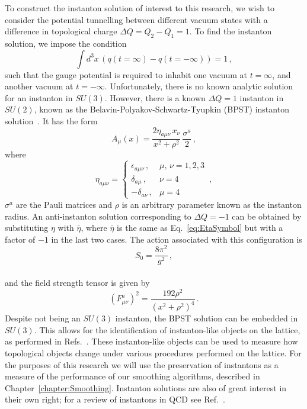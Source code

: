 To construct the instanton solution of interest to this research, we wish to consider the potential tunnelling between different vacuum states with a difference in topological charge $\Delta Q = Q_2-Q_1 =1$. To find the instanton solution, we impose the condition
%
\begin{equation}
\int d^3x \,\left(q(t=\infty)-q(t=-\infty)\right)=1\, ,
\end{equation}
%
such that the gauge potential is required to inhabit one vacuum at $t=\infty$, and another vacuum at $t=-\infty$. Unfortunately, there is no known analytic solution for an instanton in $SU(3)$. However, there is a known $\Delta Q=1$ instanton in $SU(2)$, known as the Belavin-Polyakov-Schwartz-Tyupkin (BPST) instanton solution~\cite{Belavin:1975fg}. It has the form
%
\begin{equation}
A_\mu(x) = \frac{2\eta_{a\mu\nu}\,x_\nu}{x^2+\rho^2}\,\frac{\sigma^a}{2}\, ,
\label{eq:InstantonSolution}
\end{equation}
%
where
%
\begin{equation}
\eta_{a\mu\nu} =
\begin{cases}
\epsilon_{a\mu\nu}\, , & \mu,\,\nu = 1,2,3\\
\delta_{a\mu}\, , & \nu=4\\
-\delta_{a\nu}\, , & \mu=4
\end{cases}\, ,
\label{eq:EtaSymbol}
\end{equation}
%
$\sigma^a$ are the Pauli matrices and $\rho$ is an arbitrary parameter known as the instanton radius. An anti-instanton solution corresponding to $\Delta Q=-1$ can be obtained by substituting $\eta$ with $\bar{\eta}$, where $\bar{\eta}$ is the same as Eq.~\ref{eq:EtaSymbol} but with a factor of $-1$ in the last two cases. The action associated with this configuration is 
%
\begin{equation}
S_0 = \frac{8\pi^2}{g^2}\, ,
\end{equation}\\
%
and the field strength tensor is given by~\cite{Schafer:1996wv}
%
\begin{equation}
\left(F_{\mu\nu}^a\right)^2 = \frac{192\rho^2}{\left(x^2+\rho^2\right)^4}\, .
\label{eq:InstantonFieldStrength}
\end{equation}
%
Despite not being an $SU(3)$ instanton, the BPST solution can be embedded in $SU(3)$. This allows for the identification of instanton-like objects on the lattice, as performed in Refs.~\cite{Trewartha:2015ida,Moran:2008qd}. These instanton-like objects can be used to measure how topological objects change under various procedures performed on the lattice. For the purposes of this research we will use the preservation of instantons as a measure of the performance of our smoothing algorithms, described in Chapter~\ref{chapter:Smoothing}. Instanton solutions are also of great interest in their own right; for a review of instantons in QCD see Ref.~\cite{Schafer:1996wv}. 

